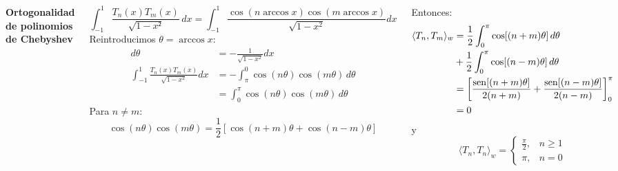 \documentclass[9pt, aspectratio=169]{beamer}
\begin{document}
\begin{frame}
\begin{columns}[t]
\cx
\textbf{ Ortogonalidad de polinomios de Chebyshev }

\[ \int_{-1}^1 \frac{T_n(x) T_m(x)}{\sqrt{1 - x²}} \, dx = \int_{-1}^1 \frac{\cos(n \arccos x) \cos(m \arccos x)}{\sqrt{1 - x^2}} dx \]
Reintroducimos $\theta = \arccos x$:
\begin{align*}
d\theta &= -\frac{1}{\sqrt{1 - x^2}} dx \\
\int_{-1}^1 \frac{T_n(x) T_m(x)}{\sqrt {1 - x^2}} dx &= -\int_{\pi}^0 \cos(n \theta) \cos(m \theta) \, d\theta \\
  &= \int_{0}^{\pi} \cos(n \theta) \cos(m \theta) \, d\theta 
\end{align*}
Para $n \neq m$:
\[ \cos(n \theta) \cos(m \theta) = \frac{1}{2}[\cos(n+m) \theta + \cos(n-m)\theta] \]

\vspace{7em}

Entonces:
\begin{align*}
    \langle T_n, T_m \rangle_w &= \frac{1}{2} \int_0^{\pi} \cos[(n+m) \theta] \, d\theta \\
      &+\frac{1}{2} \int_0^{\pi} \cos[(n-m) \theta] \, d\theta \\
      &= \left[ \frac{\operatorname{sen}[(n+m) \theta]}{2(n+m)} + \frac{\operatorname{sen}[(n-m) \theta]}{2(n-m)} \right]_0^{\pi}  \\
      &= 0
\end{align*}
y
\[ \langle T_n, T_n \rangle_w = 
    \begin{cases}
    \frac{\pi}{2}, &n \geq 1 \\
    \pi, &n = 0
\end{cases} \]
\end{columns}
\end{frame}
\end{document}

